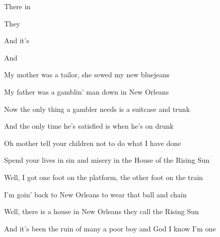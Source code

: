 

\zs
There   in  

They   

And it's    

And    
\ks

\zs
My mother was a tailor, she sewed my new bluejeans

My father was a gamblin' man down in New Orleans
\ks

\zs
Now the only thing a gambler needs is a suitcase and trunk

And the only time he's satisfied is when he's on drunk
\ks

\zs
Oh mother tell your children not to do what I have done

Spend your lives in sin and misery in the House of the Rising Sun
\ks

\zs
Well, I got one foot on the platform, the other foot on the train

I'm goin' back to New Orleans to wear that ball and chain
\ks

\zs
Well, there is a house in New Orleans they call the Rising Sun

And it's been the ruin of many a poor boy and God I know I'm one
\ks

\kp
